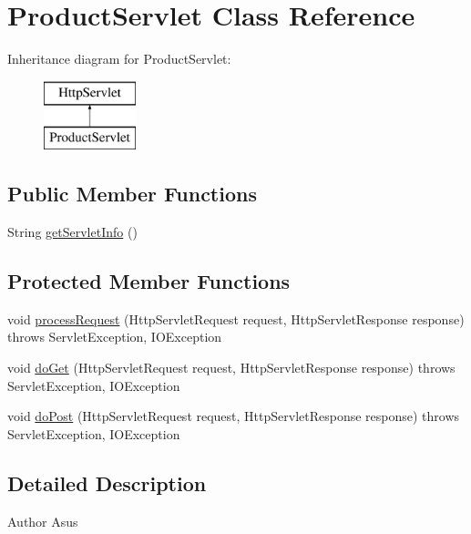 \hypertarget{class_product_servlet}{}\section{Product\+Servlet Class Reference}
\label{class_product_servlet}
Inheritance diagram for Product\+Servlet\+:\begin{figure}[H]
\begin{center}
\leavevmode
\includegraphics[height=2.000000cm]{class_product_servlet}
\end{center}
\end{figure}
\subsection*{Public Member Functions}
\begin{DoxyCompactItemize}
\item 
String \mbox{\hyperlink{class_product_servlet_a1e34fde9a46b47c66c28f6e1b939757f}{get\+Servlet\+Info}} ()
\end{DoxyCompactItemize}
\subsection*{Protected Member Functions}
\begin{DoxyCompactItemize}
\item 
void \mbox{\hyperlink{class_product_servlet_a748fbea7145fcb13f23bfb5a34bec99a}{process\+Request}} (Http\+Servlet\+Request request, Http\+Servlet\+Response response)  throws Servlet\+Exception, I\+O\+Exception 
\item 
void \mbox{\hyperlink{class_product_servlet_a257ee7ed299fc9a1cf2d1061b4051d99}{do\+Get}} (Http\+Servlet\+Request request, Http\+Servlet\+Response response)  throws Servlet\+Exception, I\+O\+Exception 
\item 
void \mbox{\hyperlink{class_product_servlet_a5dce61b053b3935394535410a9da3192}{do\+Post}} (Http\+Servlet\+Request request, Http\+Servlet\+Response response)  throws Servlet\+Exception, I\+O\+Exception 
\end{DoxyCompactItemize}


\subsection{Detailed Description}
\begin{DoxyAuthor}{Author}
Asus 
\end{DoxyAuthor}


